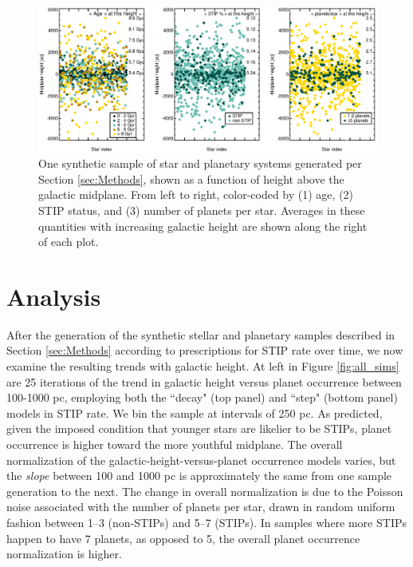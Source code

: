 \documentclass[twocolumn]{aastex631}
\begin{document}
\begin{figure}
    \centering
    \includegraphics[trim={0.5cm 0 0.5cm 0}, width=7.0in]{figures/midplane_distributions.eps}
    \caption{One synthetic sample of star and planetary systems generated per Section \ref{sec:Methods}, shown as a function of height above the galactic midplane. From left to right, color-coded by (1) age, (2) STIP status, and (3) number of planets per star. Averages in these quantities with increasing galactic height are shown along the right of each plot.}
    \label{fig:midplane_sample}
\end{figure}

\section{Analysis}
\label{sec:analysis}

After the generation of the synthetic stellar and planetary samples described in Section \ref{sec:Methods} according to prescriptions for STIP rate over time, we now examine the resulting trends with galactic height. At left in Figure \ref{fig:all_sims} are 25 iterations of the trend in galactic height versus planet occurrence between 100-1000 pc, employing both the ``decay" (top panel) and ``step" (bottom panel) models in STIP rate. We bin the sample at intervals of 250 pc. As predicted, given the imposed condition that younger stars are likelier to be STIPs, planet occurrence is higher toward the more youthful midplane. The overall normalization of the galactic-height-versus-planet occurrence models varies, but the \textit{slope} between 100 and 1000 pc is approximately the same from one sample generation to the next. The change in overall normalization is due to the Poisson noise associated with the number of planets per star, drawn in random uniform fashion between 1--3 (non-STIPs) and 5--7 (STIPs). In samples where more STIPs happen to have 7 planets, as opposed to 5, the overall planet occurrence normalization is higher. 
\end{document}
